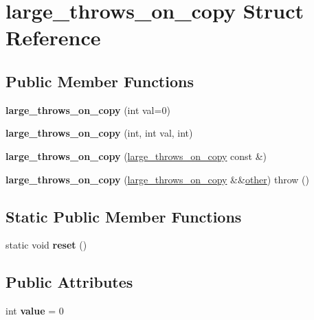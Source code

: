 \hypertarget{structlarge__throws__on__copy}{}\section{large\+\_\+throws\+\_\+on\+\_\+copy Struct Reference}
\label{structlarge__throws__on__copy}
\subsection*{Public Member Functions}
\begin{DoxyCompactItemize}
\item 
\mbox{\label{structlarge__throws__on__copy_a19b9fc60d98c14a3a2fa3d9d53034e4b}} 
{\bfseries large\+\_\+throws\+\_\+on\+\_\+copy} (int val=0)
\item 
\mbox{\label{structlarge__throws__on__copy_aba048c5eb31efbc3178afb32cb96939c}} 
{\bfseries large\+\_\+throws\+\_\+on\+\_\+copy} (int, int val, int)
\item 
\mbox{\label{structlarge__throws__on__copy_a04fa0c530f1dc01b40d8c9fdd08d8553}} 
{\bfseries large\+\_\+throws\+\_\+on\+\_\+copy} (\mbox{\hyperlink{structlarge__throws__on__copy}{large\+\_\+throws\+\_\+on\+\_\+copy}} const \&)
\item 
\mbox{\label{structlarge__throws__on__copy_a7745934941983c23dfc9a3c2217ed36c}} 
{\bfseries large\+\_\+throws\+\_\+on\+\_\+copy} (\mbox{\hyperlink{structlarge__throws__on__copy}{large\+\_\+throws\+\_\+on\+\_\+copy}} \&\&\mbox{\hyperlink{structother}{other}})  throw ()
\end{DoxyCompactItemize}
\subsection*{Static Public Member Functions}
\begin{DoxyCompactItemize}
\item 
\mbox{\label{structlarge__throws__on__copy_aa6068ffe8bd6849800a0287c0b07e3ec}} 
static void {\bfseries reset} ()
\end{DoxyCompactItemize}
\subsection*{Public Attributes}
\begin{DoxyCompactItemize}
\item 
\mbox{\label{structlarge__throws__on__copy_a159d5cf8311edffb81a75f96e99a7a55}} 
int {\bfseries value} = 0
\end{DoxyCompactItemize}
